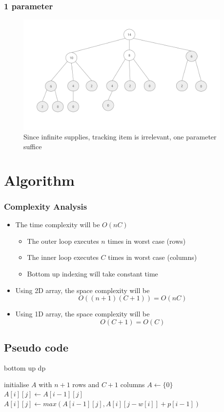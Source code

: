 \documentclass{beamer}
\begin{document}
\begin{frame}
	\frametitle{1 parameter}
	\begin{figure}
		\centering
		\includegraphics[width=0.95\textwidth]{asset/3.png}
		\caption{Since infinite supplies, tracking item is irrelevant, one parameter suffice}
	\end{figure}	
\end{frame}


\section{Algorithm}
\begin{frame}
	\frametitle{Complexity Analysis}
	\begin{itemize}
		\item The time complexity will be \( O(nC) \) 		
			\begin{itemize}
				\item The outer loop executes \( n \) times in worst case (rows)
				\item The inner loop executes \( C \) times in worst case (columns)
				\item Bottom up indexing will take constant time 
			\end{itemize}
		\item Using 2D array, the space complexity will be
			\[
				O((n+1)(C+1)) = O(nC)
			\]
		\item Using 1D array, the space complexity will be
			\[
				O(C+1) = O(C)
			\]
	\end{itemize}
\end{frame}

\subsection{Pseudo code}
\begin{frame}
		\begin{algorithm}[H]
		\caption{bottom up dp}
		\begin{algorithmic}[1]
			\State initialise \( A \) with \( n+1 \) rows and \( C+1 \) columns
			\State \( A \gets \{0\} \) 
			\State $A[i][j] \gets A[i-1][j]$ 
			\Else
			\State \( A[i][j] \gets max(A[i-1][j], A[i][j-w[i]]+p[i-1]) \) 
			\EndIf
			\EndFor
			\EndFor
			\EndFunction
		\end{algorithmic}
	\end{algorithm}	
\end{frame}
\end{document}
